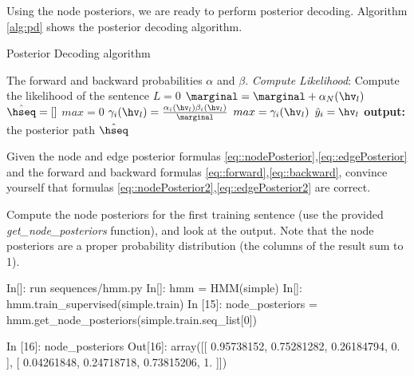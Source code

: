 Using the node posteriors, we are ready to perform posterior
decoding. Algorithm \ref{alg:pd} shows the posterior decoding algorithm.

\begin{algorithm}[t]
   \caption{Posterior Decoding algorithm \label{alg:pd}}
\begin{algorithmic}[1]
    The forward and backward probabilities
       $\alpha$ and $\beta$.
   \STATE  \emph{Compute Likelihood}: Compute the likelihood of the
   sentence
   \STATE $L = 0$
   \STATE $\marginal = \marginal + \alpha_N(\hv_l)$
   \ENDFOR 
   \STATE $\hat \hseq = []$
    \STATE $max = 0$
     \STATE $\gamma_i(\hv_l)  =  \frac{\alpha_i(\hv_l)
       \beta_i(\hv_l)}{\marginal}$
     \STATE $max = \gamma_i(\hv_l)$
     \STATE $\hat  y_i = \hv_l$
     \ENDIF
     \ENDFOR 
     \ENDFOR 
   \STATE \textbf{output:} the posterior path $\hat \hseq$
\end{algorithmic}
\end{algorithm}



\begin{exercise}
Given the node and edge posterior formulas \ref{eq::nodePosterior},\ref{eq::edgePosterior} and the
  forward and backward formulas \ref{eq::forward},\ref{eq::backward}, convince yourself that formulas
  \ref{eq::nodePosterior2},\ref{eq::edgePosterior2} are correct. 

Compute the node posteriors for the first training sentence (use the provided \emph{get\_node\_posteriors} function), and look at
the output. Note that the node posteriors are a proper
probability distribution (the columns of the result sum to 1).

\begin{python}
In[]:  run sequences/hmm.py
In[]: hmm = HMM(simple)
In[]: hmm.train_supervised(simple.train)
In [15]: node_posteriors = hmm.get_node_posteriors(simple.train.seq_list[0])

In [16]: node_posteriors
Out[16]: 
array([[ 0.95738152,  0.75281282,  0.26184794,  0.        ],
       [ 0.04261848,  0.24718718,  0.73815206,  1.        ]])
\end{python}
\end{exercise}

